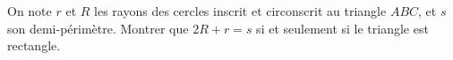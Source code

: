 On note $r$ et $R$ les rayons des cercles inscrit et circonscrit au triangle $ABC$, et $s$ son demi-périmètre. Montrer que $2R + r = s$ si et seulement si le triangle est rectangle.
